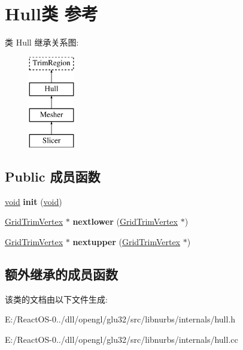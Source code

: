 \hypertarget{class_hull}{}\section{Hull类 参考}
\label{class_hull}
类 Hull 继承关系图\+:\begin{figure}[H]
\begin{center}
\leavevmode
\includegraphics[height=4.000000cm]{class_hull}
\end{center}
\end{figure}
\subsection*{Public 成员函数}
\begin{DoxyCompactItemize}
\item 
\mbox{\label{class_hull_a4472c39fec0713d1e139aae45f4dbc56}} 
\hyperlink{interfacevoid}{void} {\bfseries init} (\hyperlink{interfacevoid}{void})
\item 
\mbox{\label{class_hull_ac81aa1417b8e72fc6c7ce3dde213894c}} 
\hyperlink{class_grid_trim_vertex}{Grid\+Trim\+Vertex} $\ast$ {\bfseries nextlower} (\hyperlink{class_grid_trim_vertex}{Grid\+Trim\+Vertex} $\ast$)
\item 
\mbox{\label{class_hull_aa5441df18370ab71337502303fbc607c}} 
\hyperlink{class_grid_trim_vertex}{Grid\+Trim\+Vertex} $\ast$ {\bfseries nextupper} (\hyperlink{class_grid_trim_vertex}{Grid\+Trim\+Vertex} $\ast$)
\end{DoxyCompactItemize}
\subsection*{额外继承的成员函数}


该类的文档由以下文件生成\+:\begin{DoxyCompactItemize}
\item 
E\+:/\+React\+O\+S-\/0../dll/opengl/glu32/src/libnurbs/internals/hull.\+h\item 
E\+:/\+React\+O\+S-\/0../dll/opengl/glu32/src/libnurbs/internals/hull.\+cc\end{DoxyCompactItemize}
